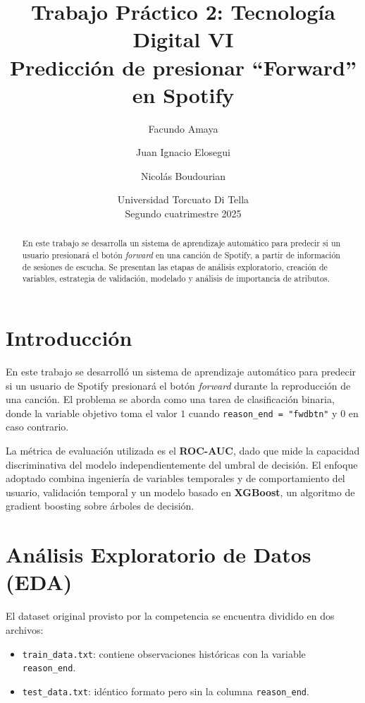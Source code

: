 \documentclass[12pt,a4paper]{article}
\title{\vspace{-2cm}\textbf{Trabajo Práctico 2: Tecnología Digital VI}\\[0.2cm]
\large Predicción de presionar “Forward” en Spotify}
\author{Facundo Amaya \and Juan Ignacio Elosegui \and Nicolás Boudourian}
\date{Universidad Torcuato Di Tella \\ Segundo cuatrimestre 2025}
\begin{document}
\maketitle
\thispagestyle{empty}
\vspace{1cm}

\begin{abstract}
\noindent
En este trabajo se desarrolla un sistema de aprendizaje automático para predecir si un usuario presionará el botón \textit{forward} en una canción de Spotify, a partir de información de sesiones de escucha. 
Se presentan las etapas de análisis exploratorio, creación de variables, estrategia de validación, modelado y análisis de importancia de atributos.
\end{abstract}

\newpage

\section{Introducción}

En este trabajo se desarrolló un sistema de aprendizaje automático para predecir si un usuario de Spotify presionará el botón \textit{forward} durante la reproducción de una canción. 
El problema se aborda como una tarea de clasificación binaria, donde la variable objetivo toma el valor $1$ cuando \texttt{reason\_end = "fwdbtn"} y $0$ en caso contrario.  

La métrica de evaluación utilizada es el \textbf{ROC-AUC}, dado que mide la capacidad discriminativa del modelo independientemente del umbral de decisión.  
El enfoque adoptado combina ingeniería de variables temporales y de comportamiento del usuario, validación temporal y un modelo basado en \textbf{XGBoost}, un algoritmo de gradient boosting sobre árboles de decisión.


\section{Análisis Exploratorio de Datos (EDA)}

El dataset original provisto por la competencia se encuentra dividido en dos archivos: 
\begin{itemize}
    \item \texttt{train\_data.txt}: contiene observaciones históricas con la variable \texttt{reason\_end}.
    \item \texttt{test\_data.txt}: idéntico formato pero sin la columna \texttt{reason\_end}.
\end{itemize}
\end{document}
